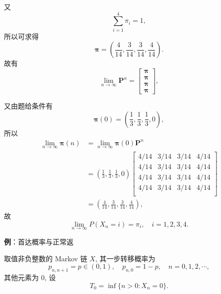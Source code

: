 \documentclass[openany]{ctexbook}
\theoremstyle{kaiti}
\theoremstyle{normal}
\begin{document}
又
\begin{equation}
  \sum_{i=1}^4\pi_i=1,
\end{equation}
所以可求得
\begin{equation}
  \bm{\pi}=\left(\frac{4}{14},\frac{3}{14},\frac{3}{14},\frac{4}{14}\right).
\end{equation}
故有
\begin{equation}
  \lim_{n\to\infty}\bm{P}^n=
  \begin{bmatrix}
    \bm{\pi}\\\bm{\pi}\\\bm{\pi}\\\bm{\pi}
  \end{bmatrix},
\end{equation}

又由题给条件有
\begin{equation}
  \bm{\pi}(0)=\left(\frac{1}{3},\frac{1}{3},\frac{1}{3},0\right),
\end{equation}
所以
\begin{equation}
  \begin{aligned}
    \lim_{n\to\infty}\bm{\pi}(n)
    &=\lim_{n\to\infty}\bm{\pi}(0)\bm{P}^n\\
    &=\left(\frac{1}{3},\frac{1}{3},\frac{1}{3},0\right)
    \begin{bmatrix}
      4/14 & 3/14 & 3/14 & 4/14 \\
      4/14 & 3/14 & 3/14 & 4/14 \\
      4/14 & 3/14 & 3/14 & 4/14 \\
      4/14 & 3/14 & 3/14 & 4/14 \\
    \end{bmatrix}\\
    &=\left(\frac{4}{14},\frac{3}{14},\frac{3}{14},\frac{4}{14}\right),
  \end{aligned}
\end{equation}
故
\begin{equation}
  \lim_{n\to\infty}P(X_n=i)=\pi_i,\quad i=1,2,3,4.
\end{equation}

\textbf{例}：首达概率与正常返

取值非负整数的 Markov 链 $X$, 其一步转移概率为
\begin{equation}
  p_{n,n+1}=p\in(0,1),\quad p_{n,0}=1-p,\quad n=0,1,2,\cdots,
\end{equation}
 其他元素为 $0$, 设
\begin{equation}
  T_0=\inf\{n>0:X_n=0\}.
\end{equation}
\end{document}
